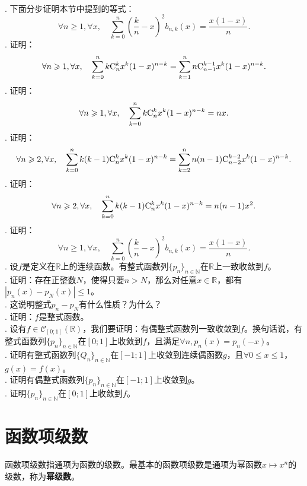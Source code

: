 \documentclass[12pt,UTF8,fontset=none]{ctexbook}
\begin{document}
\begin{appendix}
\begin{xt}
    \mbox{} \\
    . 下面分步证明本节中提到的等式：
    \[\forall n \geqslant 1, \forall x, \quad \sum_{k=0}^n \left(\frac{k}{n} - x\right)^2 b_{n,k}(x) = \frac{x(1 - x)}{n}.\]
    . 证明：
    \[\forall n \geqslant 1, \forall x, \quad \sum_{k=0}^n k \mathrm{C}_{n}^{k} x^k(1 - x)^{n-k} = \sum_{k=1}^n n \mathrm{C}_{n-1}^{k-1} x^k(1 - x)^{n-k}. \]
    . 证明：
    \[\forall n \geqslant 1, \forall x, \quad \sum_{k=0}^n k \mathrm{C}_{n}^{k} x^k(1 - x)^{n-k} = nx.\]
    . 证明：
    \[\forall n \geqslant 2, \forall x, \quad \sum_{k=0}^n k(k - 1) \mathrm{C}_{n}^{k} x^k(1 - x)^{n-k} = \sum_{k=2}^n n(n - 1) \mathrm{C}_{n-2}^{k-2} x^k(1 - x)^{n-k}. \]
    . 证明：
    \[\forall n \geqslant 2, \forall x, \quad \sum_{k=0}^n k(k - 1) \mathrm{C}_{n}^{k} x^k(1 - x)^{n-k} = n(n - 1) x^2. \]
    . 证明：
    \[\forall n \geqslant 1, \forall x, \quad \sum_{k=0}^n \left(\frac{k}{n} - x\right)^2 b_{n,k}(x) = \frac{x(1 - x)}{n}.\]
    . 设$f$是定义在$\mathbb{R}$上的连续函数。有整式函数列$\{p_n\}_{n\in\mathbb{N}}$在$\mathbb{R}$上一致收敛到$f$。\\
    . 证明：存在正整数$N$，使得只要$n>N$，那么对任意$x\in\mathbb{R}$，都有$|p_n(x) - p_N(x)| \leqslant 1$。\\
    . 这说明整式$p_n - p_N$有什么性质？为什么？\\
    . 证明：$f$是整式函数。\\
    . 设有$f\in\mathcal{C}_{[0;1]}(\mathbb{R})$，我们要证明：有偶整式函数列一致收敛到$f$。换句话说，有整式函数列$\{p_n\}_{n\in\mathbb{N}}$在$[0;1]$上收敛到$f$，且满足$\forall n, p_n(x) = p_n(-x)$。\\
    . 证明有整式函数列$\{Q_n\}_{n\in\mathbb{N}}$在$[-1;1]$上收敛到连续偶函数$g$，且$\forall 0\leqslant x\leqslant 1$，$g(x) = f(x)$。\\
    . 证明有偶整式函数列$\{p_n\}_{n\in\mathbb{N}}$在$[-1;1]$上收敛到$g$。\\
    . 证明$\{p_n\}_{n\in\mathbb{N}}$在$[0;1]$上收敛到$f$。
\end{xt}

\section{函数项级数}

函数项级数指通项为函数的级数。最基本的函数项级数是通项为幂函数$x\mapsto x^n$的级数，称为\textbf{幂级数}。


\end{appendix}
\end{document}
